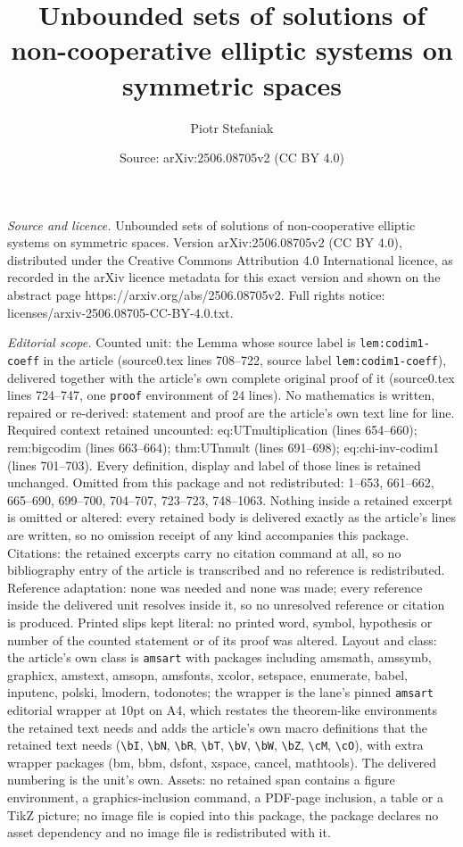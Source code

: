 \documentclass[10pt,a4paper]{amsart}
\title[Unbounded sets of solutions of non-cooperative elliptic syst]{Unbounded sets of solutions of non-cooperative elliptic systems on symmetric spaces}
\author{Piotr Stefaniak}
\date{Source: arXiv:2506.08705v2 (CC BY 4.0)}
\begin{document}
\maketitle

\noindent\emph{Source and licence.} Unbounded sets of solutions of non-cooperative elliptic systems on symmetric spaces. Version arXiv:2506.08705v2 (CC BY 4.0), distributed under the Creative Commons Attribution 4.0 International licence, as recorded in the arXiv licence metadata for this exact version and shown on the abstract page https://arxiv.org/abs/2506.08705v2. Full rights notice: licenses/arxiv-2506.08705-CC-BY-4.0.txt.\par\smallskip

\noindent\textit{Editorial scope.} Counted unit: the Lemma whose source label is \texttt{lem:codim1-coeff} in the article (source0.tex lines 708--722, source label \texttt{lem:codim1-coeff}), delivered together with the article's own complete original proof of it (source0.tex lines 724--747, one \texttt{proof} environment of 24 lines). No mathematics is written, repaired or re-derived: statement and proof are the article's own text line for line. Required context retained uncounted: eq:UTmultiplication (lines 654--660); rem:bigcodim (lines 663--664); thm:UTnmult (lines 691--698); eq:chi-inv-codim1 (lines 701--703). Every definition, display and label of those lines is retained unchanged. Omitted from this package and not redistributed: 1--653, 661--662, 665--690, 699--700, 704--707, 723--723, 748--1063. Nothing inside a retained excerpt is omitted or altered: every retained body is delivered exactly as the article's lines are written, so no omission receipt of any kind accompanies this package. Citations: the retained excerpts carry no citation command at all, so no bibliography entry of the article is transcribed and no reference is redistributed. Reference adaptation: none was needed and none was made; every reference inside the delivered unit resolves inside it, so no unresolved reference or citation is produced. Printed slips kept literal: no printed word, symbol, hypothesis or number of the counted statement or of its proof was altered. Layout and class: the article's own class is \texttt{amsart} with packages including amsmath, amssymb, graphicx, amstext, amsopn, amsfonts, xcolor, setspace, enumerate, babel, inputenc, polski, lmodern, todonotes; the wrapper is the lane's pinned \texttt{amsart} editorial wrapper at 10pt on A4, which restates the theorem-like environments the retained text needs and adds the article's own macro definitions that the retained text needs (\texttt{\textbackslash bI}, \texttt{\textbackslash bN}, \texttt{\textbackslash bR}, \texttt{\textbackslash bT}, \texttt{\textbackslash bV}, \texttt{\textbackslash bW}, \texttt{\textbackslash bZ}, \texttt{\textbackslash cM}, \texttt{\textbackslash cO}), with extra wrapper packages (bm, bbm, dsfont, xspace, cancel, mathtools). The delivered numbering is the unit's own. Assets: no retained span contains a figure environment, a graphics-inclusion command, a PDF-page inclusion, a table or a TikZ picture; no image file is copied into this package, the package declares no asset dependency and no image file is redistributed with it. 
\end{document}
